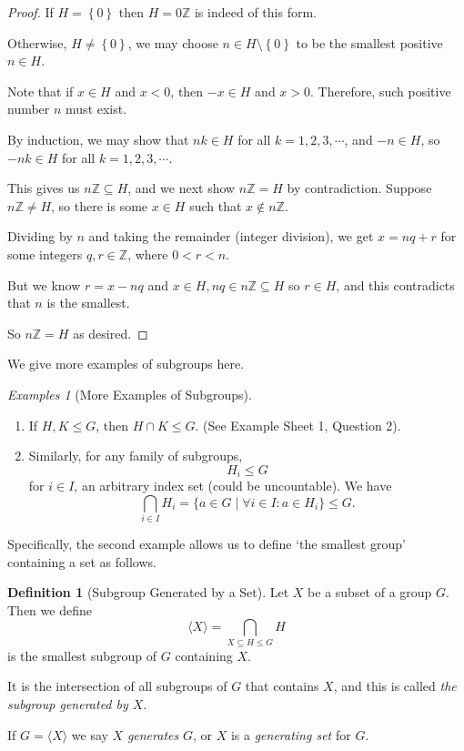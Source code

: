 \documentclass{article}
\theoremstyle{definition}
\newtheorem{definition}[theorem]{Definition}
\theoremstyle{remark}
\newcommand{\Bqty}[1]{\left\{#1\right\}}
\newcommand{\angBrac}[1]{\langle #1\rangle}
\newcommand{\set}[2]{\{#1\mid #2\}}
\newcommand{\subgroup}{\leq}
\newcommand{\ZZ}{\mathbb{Z}}
\newtheorem*{examples*}{Examples}
\begin{document}
\begin{proof}
    If \(H = \Bqty{0}\) then \(H = 0\ZZ\) is indeed of this form.

    Otherwise, \(H \neq \Bqty{0}\), we may choose \(n \in H \setminus \Bqty{0}\) to be the smallest positive \(n \in H\).

    Note that if \(x \in H\) and \(x < 0\), then \(-x \in H\) and \(x > 0\). Therefore, such positive number \(n\) must exist.

    By induction, we may show that \(nk \in H\) for all \(k = 1, 2, 3, \cdots\), and \(-n \in H\), so \(-nk \in H\) for all \(k = 1, 2, 3, \cdots\).

    This gives us \(n\ZZ \subseteq H\), and we next show \(n\ZZ = H\) by contradiction. Suppose \(n \ZZ \neq H\), so there is some \(x \in H\) such that \(x \notin n\ZZ\).

    Dividing by \(n\) and taking the remainder (integer division), we get \(x = nq + r\) for some integers \(q, r \in \ZZ\), where \(0 < r < n\).

    But we know \(r = x - nq\) and \(x \in H, nq \in n\ZZ \subseteq H\) so \(r \in H\), and this contradicts that \(n\) is the smallest.

    So \(n\ZZ = H\) as desired.
\end{proof}

We give more examples of subgroups here.

\begin{examples*}[More Examples of Subgroups]
    \begin{enumerate}
        \item If \(H, K \subgroup G\), then \(H \cap K \subgroup G\). (See Example Sheet 1, Question 2).
        \item Similarly, for any family of subgroups,
        \[
            H_i \subgroup G
        \]
        for \(i \in I\), an arbitrary index set (could be uncountable). We have
        \[
            \bigcap_{i \in I} H_i = \set{a \in G}{\forall i \in I: a \in H_i} \subgroup G.
        \]
    \end{enumerate}
\end{examples*}

Specifically, the second example allows us to define `the smallest group' containing a set as follows.

\begin{definition}[Subgroup Generated by a Set]
    \label{def:generating-set}%
    Let \(X\) be a subset of a group \(G\). Then we define
    \[
        \angBrac{X} = \bigcap_{X \subseteq H \subgroup G} H
    \]
    is the smallest subgroup of \(G\) containing \(X\).

    It is the intersection of all subgroups of \(G\) that contains \(X\), and this is called \emph{the subgroup generated by \(X\)}.

    If \(G = \angBrac{X}\) we say \(X\) \emph{generates} \(G\), or \(X\) is a \emph{generating set} for \(G\).
\end{definition}
\end{document}
